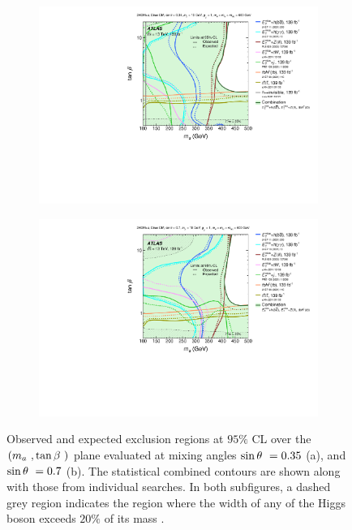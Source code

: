 \begin{figure}[h!]
    \centering
    \begin{subfigure}[2]{0.495\textwidth}
        \centering
        \includegraphics[width=\linewidth]{figures/fig_06a.pdf}
        \caption{}
        \label{fig:result-ma-tanb-scan-a}
    \end{subfigure}
    \begin{subfigure}[2]{0.495\textwidth}
        \centering
        \includegraphics[width=\linewidth]{figures/fig_06b.pdf}
        \caption{}
        \label{fig:result-ma-tanb-scan-b}
    \end{subfigure}
    \caption{Observed and expected exclusion regions at $95\%$ CL over the $(m_a~, \tan\beta~)$ plane evaluated at \thdma mixing angles $\sin\theta~=0.35$ (a), and $\sin\theta~=0.7$ (b). The statistical combined contours are shown along with those from individual searches. In both subfigures, a dashed grey region indicates the region where the width of any of the Higgs boson exceeds $20\%$ of its mass \cite{2hdma_comb}. }
    \label{fig:result-ma-tanb-scan}
\end{figure} 

